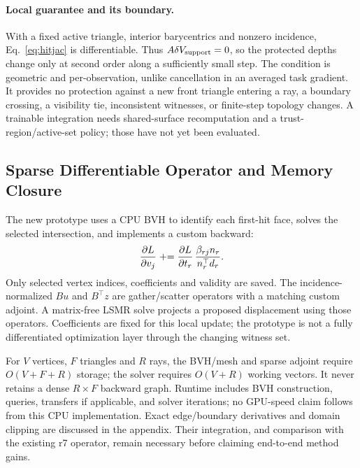 \paragraph{Local guarantee and its boundary.}
With a fixed active triangle, interior barycentrics and nonzero incidence, Eq.~\ref{eq:hitjac} is differentiable. Thus $A\delta V_{\rm support}=0$, so the protected depths change only at second order along a sufficiently small step. The condition is geometric and per-observation, unlike cancellation in an averaged task gradient. It provides no protection against a new front triangle entering a ray, a boundary crossing, a visibility tie, inconsistent witnesses, or finite-step topology changes. A trainable integration needs shared-surface recomputation and a trust-region/active-set policy; those have not yet been evaluated.

\subsection{Sparse Differentiable Operator and Memory Closure}
\label{sec:operator}
The new prototype uses a CPU BVH to identify each first-hit face, solves the selected intersection, and implements a custom backward:
\begin{equation}
 {\partial L\over\partial v_j}\mathrel{+}=
 {\partial L\over\partial t_r}\,{\beta_{rj}n_r\over n_r^\top d_r}.
 \label{eq:backward}
\end{equation}
Only selected vertex indices, coefficients and validity are saved. The incidence-normalized $Bu$ and $B^\top z$ are gather/scatter operators with a matching custom adjoint. A matrix-free LSMR solve projects a proposed displacement using those operators. Coefficients are fixed for this local update; the prototype is not a fully differentiated optimization layer through the changing witness set.

For $V$ vertices, $F$ triangles and $R$ rays, the BVH/mesh and sparse adjoint require $O(V+F+R)$ storage; the solver requires $O(V+R)$ working vectors. It never retains a dense $R\times F$ backward graph. Runtime includes BVH construction, queries, transfers if applicable, and solver iterations; no GPU-speed claim follows from this CPU implementation. Exact edge/boundary derivatives and domain clipping are discussed in the appendix. Their integration, and comparison with the existing r7 operator, remain necessary before claiming end-to-end method gains.
